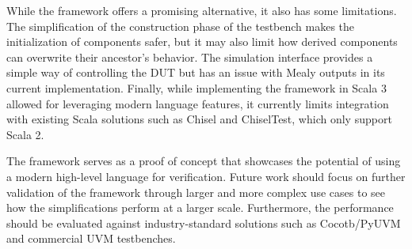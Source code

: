 While the framework offers a promising alternative, it also has some limitations. The simplification of the construction phase of the testbench makes the initialization of components safer, but it may also limit how derived components can overwrite their ancestor's behavior. The simulation interface provides a simple way of controlling the DUT but has an issue with Mealy outputs in its current implementation. Finally, while implementing the framework in Scala 3 allowed for leveraging modern language features, it currently limits integration with existing Scala solutions such as Chisel and ChiselTest, which only support Scala 2.

The framework serves as a proof of concept that showcases the potential of using a modern high-level language for verification. Future work should focus on further validation of the framework through larger and more complex use cases to see how the simplifications perform at a larger scale. Furthermore, the performance should be evaluated against industry-standard solutions such as Cocotb/PyUVM and commercial UVM testbenches.


